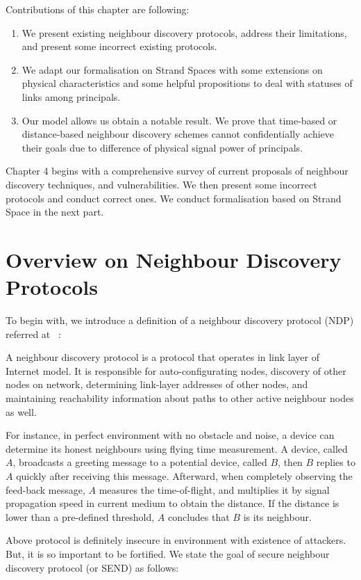 Contributions of this chapter are following:
\begin{enumerate}
\item We present existing neighbour discovery protocols, address their limitations, and present some incorrect existing protocols.  
\item We adapt our formalisation on Strand Spaces with some extensions on physical characteristics and some helpful propositions to deal with statuses of links among principals. 
\item Our model allows us obtain a notable result. We prove that time-based or distance-based neighbour discovery schemes cannot confidentially achieve their goals due to difference of physical signal power of principals. 
\end{enumerate}

Chapter 4 begins with a comprehensive survey of current proposals of neighbour discovery techniques, and vulnerabilities. We then present some incorrect protocols and conduct correct ones. We conduct formalisation based on Strand Space in the next part.  
 
 \section{Overview on Neighbour Discovery Protocols}

To begin with, we introduce a definition of a neighbour discovery protocol (NDP) referred at ~\cite{ndp}:
\begin{Definition}
A neighbour discovery protocol is a protocol that operates in link layer of Internet model. It is responsible for auto-configurating nodes, discovery of other nodes on network, determining link-layer addresses of other nodes, and maintaining reachability information about paths to other active neighbour nodes as well. 
\end{Definition}

For instance, in perfect environment with no obstacle and noise, a device can determine its honest neighbours using flying time measurement. A device, called $A$, broadcasts a greeting message to a potential device, called $B$, then $B$ replies to $A$ quickly after receiving this message. Afterward, when completely observing the feed-back message, $A$ measures the time-of-flight, and multiplies it by signal propagation speed in current medium to obtain the distance. If the distance is lower than a pre-defined threshold, $A$ concludes that $B$ is its neighbour.

Above protocol is definitely insecure in environment with existence of attackers. But, it is so important to be fortified. We state the goal of secure neighbour discovery protocol (or SEND) as follows: 

